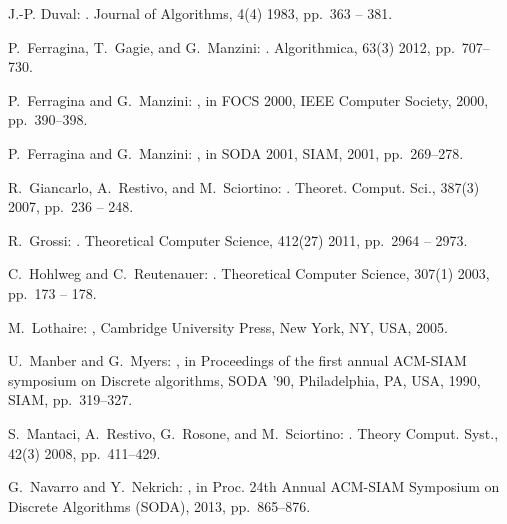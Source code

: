 \documentclass[envcountsame,runningheads]{llncs}
\begin{document}
\begin{thebibliography}{10}
{\sc J.-P. Duval}:
.
\newblock Journal of Algorithms, 4(4) 1983, pp.~363 -- 381.

{\sc P.~Ferragina, T.~Gagie, and G.~Manzini}:
.
\newblock Algorithmica, 63(3) 2012, pp.~707--730.

{\sc P.~Ferragina and G.~Manzini}:
, in FOCS 2000,
  IEEE Computer Society, 2000, pp.~390--398.

{\sc P.~Ferragina and G.~Manzini}:
, in SODA 2001,
  SIAM, 2001, pp.~269--278.

{\sc R.~Giancarlo, A.~Restivo, and M.~Sciortino}:
.
\newblock Theoret. Comput. Sci., 387(3) 2007, pp.~236 -- 248.

{\sc R.~Grossi}:
.
\newblock Theoretical Computer Science, 412(27) 2011, pp.~2964 -- 2973.

{\sc C.~Hohlweg and C.~Reutenauer}:
.
\newblock Theoretical Computer Science, 307(1) 2003, pp.~173 -- 178.

{\sc M.~Lothaire}:
, Cambridge University Press, New York, NY, USA, 2005.

{\sc U.~Manber and G.~Myers}:
, in
  Proceedings of the first annual ACM-SIAM symposium on Discrete algorithms,
  SODA '90, Philadelphia, PA, USA, 1990, SIAM, pp.~319--327.

{\sc S.~Mantaci, A.~Restivo, G.~Rosone, and M.~Sciortino}:
.
\newblock Theory Comput. Syst., 42(3) 2008, pp.~411--429.

{\sc G.~Navarro and Y.~Nekrich}:
, in Proc. 24th Annual
  ACM-SIAM Symposium on Discrete Algorithms (SODA), 2013, pp.~865--876.


\end{thebibliography}
\end{document}

